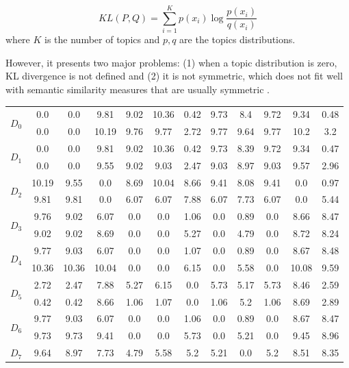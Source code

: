 \begin{equation}
KL(P,Q) = \sum\limits_{i=1}^K p(x_{i}) \log \frac{p(x_{i})}{q(x_{i})}
\label{eq:kl}
\end{equation}
where  $K$ is the number of topics and $p,q$ are the topics distributions.

However, it presents two major problems: (1) when a topic distribution is zero, KL divergence is not defined and (2) it is not symmetric, which does not fit well with semantic similarity measures that are usually symmetric \citep{Rus2013}. 


\begin{table}[!htbp]
\centering%
\small
\begin{tabularx}{\linewidth}{CCCCCCCCCCCC}
\toprule
\heading{} &  &  &  &  &  &  &  &  &  &  &  \\
\midrule
\midrule
{}&0.0&0.0&9.81&9.02&10.36&0.42&9.73&8.4&9.72&9.34&0.48\\
&0.0&0.0&10.19&9.76&9.77&2.72&9.77&9.64&9.77&10.2&3.2\\
\midrule
{}&0.0&0.0&9.81&9.02&10.36&0.42&9.73&8.39&9.72&9.34&0.47\\
&0.0&0.0&9.55&9.02&9.03&2.47&9.03&8.97&9.03&9.57&2.96\\
\midrule
{}&10.19&9.55&0.0&8.69&10.04&8.66&9.41&8.08&9.41&0.0&0.97\\
&9.81&9.81&0.0&6.07&6.07&7.88&6.07&7.73&6.07&0.0&5.44\\
\midrule
{}&9.76&9.02&6.07&0.0&0.0&1.06&0.0&0.89&0.0&8.66&8.47\\
&9.02&9.02&8.69&0.0&0.0&5.27&0.0&4.79&0.0&8.72&8.24\\
\midrule
{}&9.77&9.03&6.07&0.0&0.0&1.07&0.0&0.89&0.0&8.67&8.48\\
&10.36&10.36&10.04&0.0&0.0&6.15&0.0&5.58&0.0&10.08&9.59\\
\midrule
{}&2.72&2.47&7.88&5.27&6.15&0.0&5.73&5.17&5.73&8.46&2.59\\
&0.42&0.42&8.66&1.06&1.07&0.0&1.06&5.2&1.06&8.69&2.89\\
\midrule
{}&9.77&9.03&6.07&0.0&0.0&1.06&0.0&0.89&0.0&8.67&8.47\\
&9.73&9.73&9.41&0.0&0.0&5.73&0.0&5.21&0.0&9.45&8.96\\
\midrule
{}&9.64&8.97&7.73&4.79&5.58&5.2&5.21&0.0&5.2&8.51&8.35\\

\end{tabularx}
\end{table}
